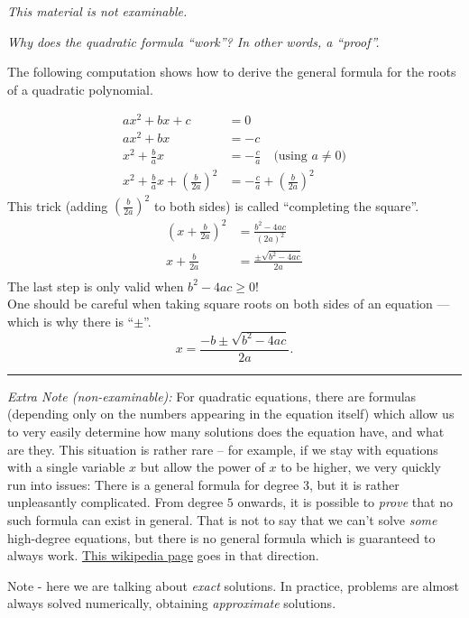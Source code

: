 \documentclass[
  12pt,
  oneside]{book}
\theoremstyle{definition}
\theoremstyle{definition}
\theoremstyle{definition}
\theoremstyle{definition}
\theoremstyle{remark}
\begin{document}
\emph{This material is not examinable.}

\emph{Why does the quadratic formula ``work''? In other words, a ``proof''.}

The following computation shows how to derive the general formula for the roots of a quadratic polynomial.

\begin{align*}
ax^2+bx+c &= 0\\
ax^2 + bx &= -c\\
x^2 + \tfrac{b}{a}x &= -\tfrac{c}{a} \quad\text{(using $a\not=0$)}\\
x^2 + \tfrac{b}{a}x + \left(\tfrac{b}{2a}\right)^2 &= -\tfrac{c}{a} + \left(\tfrac{b}{2a}\right)^2
\end{align*}
This trick (adding \(\left(\tfrac{b}{2a}\right)^2\) to both sides) is called ``completing the square''.
\begin{align*}
\left(x+\tfrac{b}{2a}\right)^2 &= \tfrac{b^2-4ac}{(2a)^2}\\
x+\tfrac{b}{2a} &= \frac{\pm\sqrt{b^2-4ac}}{2a}\\ %
\end{align*}
The last step is only valid when \(b^2-4ac\geq 0\)!\\
One should be careful when taking square roots on both sides of an equation --- which is why there is ``\(\pm\)''.
\[
x = \frac{-b\pm\sqrt{b^2-4ac}}{2a}.
\]

\begin{center}\rule{0.5\linewidth}{0.5pt}\end{center}

\emph{Extra Note (non-examinable):} For quadratic equations, there are formulas (depending only on the numbers appearing in the equation itself) which allow us to very easily determine how many solutions does the equation have, and what are they. This situation is rather rare -- for example, if we stay with equations with a single variable \(x\) but allow the power of \(x\) to be higher, we very quickly run into issues: There is a general formula for degree \(3\), but it is rather unpleasantly complicated. From degree \(5\) onwards, it is possible to \emph{prove} that no such formula can exist in general. That is not to say that we can't solve \emph{some} high-degree equations, but there is no general formula which is guaranteed to always work. \href{https://en.wikipedia.org/wiki/Galois_theory}{This wikipedia page} goes in that direction.

Note - here we are talking about \emph{exact} solutions. In practice, problems are almost always solved numerically, obtaining \emph{approximate} solutions.
\end{document}
